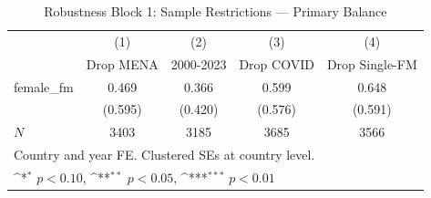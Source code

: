 \begin{table}[htbp]\centering
\def\sym#1{\ifmmode^{#1}\else\(^{#1}\)\fi}
\caption{Robustness Block 1: Sample Restrictions — Primary Balance}
\begin{tabular}{l*{4}{c}}
\hline\hline
            &\multicolumn{1}{c}{(1)}&\multicolumn{1}{c}{(2)}&\multicolumn{1}{c}{(3)}&\multicolumn{1}{c}{(4)}\\
            &\multicolumn{1}{c}{Drop MENA}&\multicolumn{1}{c}{2000-2023}&\multicolumn{1}{c}{Drop COVID}&\multicolumn{1}{c}{Drop Single-FM}\\
\hline
female\_fm   &       0.469         &       0.366         &       0.599         &       0.648         \\
            &     (0.595)         &     (0.420)         &     (0.576)         &     (0.591)         \\
\hline
\(N\)       &        3403         &        3185         &        3685         &        3566         \\
\hline\hline
\multicolumn{5}{l}{\footnotesize Country and year FE. Clustered SEs at country level.}\\
\multicolumn{5}{l}{\footnotesize \sym{*} \(p<0.10\), \sym{**} \(p<0.05\), \sym{***} \(p<0.01\)}\\
\end{tabular}
\end{table}

